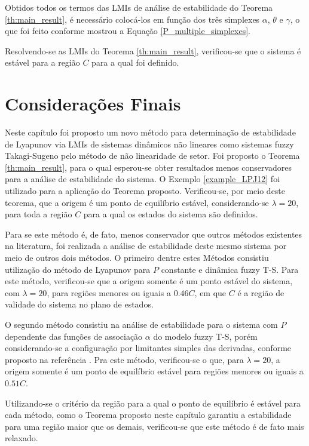 Obtidos todos os termos das LMIs de análise de estabilidade do Teorema \ref{th:main_result}, é necessário colocá-los em função dos três simplexes $\alpha$, $\theta$ e $\gamma$, o que foi feito conforme mostrou a Equação \ref{P_multiple_simplexes}.

Resolvendo-se as LMIs do Teorema \ref{th:main_result}, verificou-se que o sistema é estável para a região $C$ para a qual foi definido.

\section{Considerações Finais}

Neste capítulo foi proposto um novo método para determinação de estabilidade de Lyapunov via LMIs de sistemas dinâmicos não lineares como sistemas fuzzy Takagi-Sugeno pelo método de não linearidade de setor. Foi proposto o Teorema \ref{th:main_result}, para o qual esperou-se obter resultados menos conservadores para a análise de estabilidade do sistema. O Exemplo \ref{example_LPJ12} foi utilizado para a aplicação do Teorema proposto. Verificou-se, por meio deste teorema, que a origem é um ponto de equilíbrio estável, considerando-se $\lambda = 20$, para toda a região $C$ para a qual os estados do sistema são definidos.

Para se este método é, de fato, menos conservador que outros métodos existentes na literatura, foi realizada a análise de estabilidade deste mesmo sistema por meio de outros dois métodos. O primeiro dentre estes Métodos consistiu utilização do método de Lyapunov para $P$ constante e dinâmica fuzzy T-S. Para este método, verificou-se que a origem somente é um ponto estável do sistema, com $\lambda = 20$, para regiões menores ou iguais a $0.46C$, em que $C$ é a região de validade do sistema no plano de estados.

O segundo método consistiu na análise de estabilidade para o sistema com $P$ dependente das funções de associação $\alpha$ do modelo fuzzy T-S, porém considerando-se a configuração por limitantes simples das derivadas, conforme proposto na referência \cite{MPSM:2009}. Pra este método, verificou-se o que, para $\lambda = 20$, a origem somente é um ponto de equilíbrio estável para regiões menores ou iguais a $0.51C$.

Utilizando-se o critério da região para a qual o ponto de equilíbrio é estável para cada método, como o Teorema proposto neste capítulo garantiu a estabilidade para uma região maior que os demais, verificou-se que este método é de fato mais relaxado.

